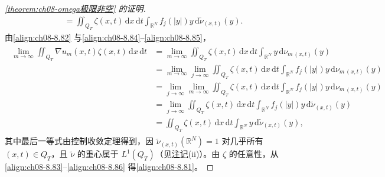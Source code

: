 \documentclass[../../main.tex]{subfiles}%
\begin{document}
\begin{proof}[\cref{theorem:ch08-omega极限非空} 的证明]
\begin{align}
=\iint_{Q_T}\zeta(x,t)\,\mathrm{d}x\,\mathrm{d}t\int_{\mathbb{R}^N}f_j(|y|)y\,\mathrm{d}\tilde\nu_{(x,t)}(y). \label{align:ch08-8.85}
\end{align}
由\eqref{align:ch08-8.82} 与\eqref{align:ch08-8.84}--\eqref{align:ch08-8.85}，
\begin{align}
\begin{aligned}
\lim_{m\to\infty}\iint_{Q_T}\nabla u_m(x,t)\zeta(x,t)\,\mathrm{d}x\,\mathrm{d}t
&=\lim_{m\to\infty}\iint_{Q_T}\zeta(x,t)\,\mathrm{d}x\,\mathrm{d}t\int_{\mathbb{R}^N}y\,\mathrm{d}\nu_{m\,(x,t)}(y)\\
&=\lim_{m\to\infty}\lim_{j\to\infty}\iint_{Q_T}\zeta(x,t)\,\mathrm{d}x\,\mathrm{d}t\int_{\mathbb{R}^N}f_j(|y|)y\,\mathrm{d}\nu_{m\,(x,t)}(y)\\
&=\lim_{j\to\infty}\lim_{m\to\infty}\iint_{Q_T}\zeta(x,t)\,\mathrm{d}x\,\mathrm{d}t\int_{\mathbb{R}^N}f_j(|y|)y\,\mathrm{d}\nu_{m\,(x,t)}(y)\\
&=\lim_{j\to\infty}\iint_{Q_T}\zeta(x,t)\,\mathrm{d}x\,\mathrm{d}t\int_{\mathbb{R}^N}f_j(|y|)y\,\mathrm{d}\tilde\nu_{(x,t)}(y)\\
&=\iint_{Q_T}\zeta(x,t)\,\mathrm{d}x\,\mathrm{d}t\int_{\mathbb{R}^N}y\,\mathrm{d}\tilde\nu_{(x,t)}(y),
\end{aligned} 
\label{align:ch08-8.86}
\end{align}
其中最后一等式由控制收敛定理得到，因 $\tilde\nu_{(x,t)}(\mathbb{R}^N)=1$ 对几乎所有 $(x,t)\in Q_T$，且 $\tilde\nu$ 的重心属于 $L^1(Q_T)$（见\hyperref[remark:ch05-一致可积加强]{注记}(ii)）。由 $\zeta$ 的任意性，从\eqref{align:ch08-8.83}--\eqref{align:ch08-8.86} 得\eqref{align:ch08-8.81}。


\end{proof}
\end{document}
